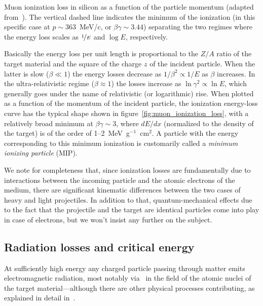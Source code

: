 \begin{marginfigure}
  
  \caption{Muon ionization loss in silicon as a function of the particle momentum
    (adapted from~\cite{PDG}). The vertical dashed line indicates the minimum of
    the ionization (in this specific case at $p \sim 363$~MeV/c, or
    $\beta\gamma \sim 3.44$) separating the two regimes where the energy loss
    scales as $\nicefrac{1}{E}$ and $\log E$, respectively.}
  \label{fig:muon_ionization_loss}
\end{marginfigure}

Basically the energy loss per unit length is proportional to the $Z/A$ ratio of
the target material and the square of the charge $z$ of the incident particle.
When the latter is slow ($\beta \ll 1$) the energy losses decrease as
$1/\beta^2 \propto 1/E$ as $\beta$ increases. In the ultra-relativistic regime
($\beta \approx 1$) the losses increase as $\ln \gamma^2 \propto \ln E$, which
generally goes under the name of relativistic (or logarithmic) rise.
When plotted as a function of the momentum of the incident particle, the ionization
energy-loss curve has the typical shape shown in figure~\ref{fig:muon_ionization_loss},
with a relatively broad minimum at $\beta\gamma \sim 3$, where $dE/dx$ (normalized
to the density of the target) is of the order of 1--2~MeV~g$^{-1}$~cm$^{2}$.
A particle with the energy corresponding to this minimum ionization is customarily
called a \emph{minimum ionizing particle} (MIP).

We note for completeness that, since ionization losses are fundamentally due to
interactions between the incoming particle and the atomic electrons of the
medium, there are significant kinematic differences between the two cases of
heavy and light projectiles. In addition to that, quantum-mechanical effects due
to the fact that the projectile and the target are identical particles come
into play in case of electrons, but we won't insist any further on the subject.


\subsection{Radiation losses and critical energy}

At sufficiently high energy any charged particle passing through matter emits
electromagnetic radiation, most notably via \bremss\ in the field of the
atomic nuclei of the target material---although there are other physical processes
contributing, as explained in detail in~\cite{2001ADNDT..78..183G}.

